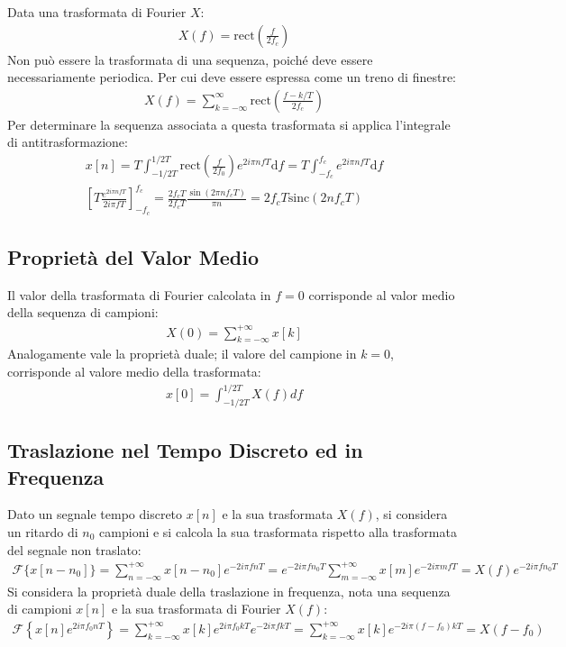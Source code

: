 \documentclass{article}
\newcommand{\rect}{\mathrm{rect}}
\newcommand{\sinc}{\mathrm{sinc}}
\newcommand{\df}{\mathrm{d}}
\numberwithin{equation}{subsection}
\begin{document}
Data una trasformata di Fourier $X$:
\begin{gather*}
    X(f)=\rect\displaystyle\left(\frac{f}{2f_c}\right)
\end{gather*}
Non può essere la trasformata di una sequenza, poiché deve essere necessariamente periodica. Per cui deve essere espressa come un treno di finestre:
\begin{gather*}
    X(f)=\displaystyle\sum_{k=-\infty}^{\infty}\rect\left(\frac{f-k/T}{2f_c}\right)
\end{gather*}
Per determinare la sequenza associata a questa trasformata si applica l'integrale di antitrasformazione:
\begin{gather*}
    x[n]=T\displaystyle\int_{-1/2T}^{1/2T}\rect\left(\frac{f}{2f_0}\right)e^{2i\pi n fT}\df f=T\int_{-f_c}^{f_c}e^{2i\pi nfT}\df f\\
    \displaystyle\left[T\frac{e^{2i\pi nfT}}{2i\pi fT}\right]^{f_c}_{-f_c}=\frac{2f_cT}{2f_cT}\frac{\sin(2\pi nf_cT)}{\pi n}=2f_cT\sinc(2nf_cT)
\end{gather*}

\subsection{Proprietà del Valor Medio}

Il valor della trasformata di Fourier calcolata in $f=0$ corrisponde al valor medio della sequenza di campioni:
\begin{gather*}
    X(0)=\displaystyle\sum_{k=-\infty}^{+\infty}x[k]
\end{gather*}
Analogamente vale la proprietà duale; il valore del campione in $k=0$, corrisponde al valore medio della trasformata:
\begin{gather*}
    x[0]=\displaystyle\int_{-1/2T}^{1/2T}X(f)df
\end{gather*}

\subsection{Traslazione nel Tempo Discreto ed in Frequenza}

Dato un segnale tempo discreto $x[n]$ e la sua trasformata $X(f)$, si considera un ritardo di $n_0$ campioni e si calcola la sua trasformata rispetto alla trasformata del 
segnale non traslato:
\begin{gather*}
    \mathscr{F}\{x[n-n_0]\}=\displaystyle\sum_{n=-\infty}^{+\infty}x[n-n_0]e^{-2i\pi fnT}=e^{-2i\pi fn_0T}\sum_{m=-\infty}^{+\infty}x[m]e^{-2i\pi mfT}=X(f)e^{-2i\pi fn_0T}
\end{gather*}
Si considera la proprietà duale della traslazione in frequenza, nota una sequenza di campioni $x[n]$ e la sua trasformata di Fourier $X(f)$:
\begin{gather*}
    \mathscr{F}\left\{x[n]e^{2i\pi f_0nT}\right\}=\displaystyle\sum_{k=-\infty}^{+\infty}x[k]e^{2i\pi f_0kT}e^{-2i\pi fkT}=\sum_{k=-\infty}^{+\infty}x[k]e^{-2i\pi (f-f_0)kT}=X(f-f_0)
\end{gather*} 
\end{document}

